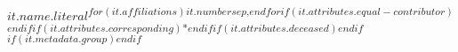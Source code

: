 $it.name.literal$\textsuperscript{$for(it.affiliations)$$it.number$$sep$,$endfor$$if(it.attributes.equal-contributor)$\Yinyang$endif$$if(it.attributes.corresponding)$*$endif$$if(it.attributes.deceased)$\dag$endif$$if(it.metadata.group)$\textpilcrow$endif$}